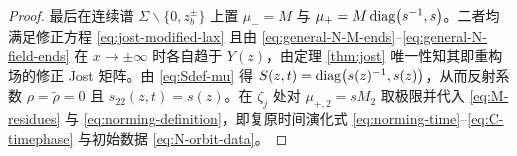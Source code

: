 \begin{proof}
最后在连续谱 $\Sigma\mathbin{\backslash}\{0,z_b^\pm\}$ 上置 $\mu_-=M$ 与 $\mu_+=M\operatorname{diag}\bigl(s^{-1},s\bigr)$。二者均满足修正方程 \eqref{eq:jost-modified-lax} 且由 \eqref{eq:general-N-M-ends}--\eqref{eq:general-N-field-ends} 在 $x\to\pm\infty$ 时各自趋于 $Y(z)$，由定理 \ref{thm:jost} 唯一性知其即重构场的修正 Jost 矩阵。由 \eqref{eq:Sdef-mu} 得 $S(z,t)=\operatorname{diag}\bigl(s(z)^{-1},s(z)\bigr)$，从而反射系数 $\rho=\widetilde\rho=0$ 且 $s_{22}(z,t)=s(z)$。在 $\zeta_j$ 处对 $\mu_{+,2}=sM_2$ 取极限并代入 \eqref{eq:M-residues} 与 \eqref{eq:norming-definition}，即复原时间演化式 \eqref{eq:norming-time}--\eqref{eq:C-timephase} 与初始数据 \eqref{eq:N-orbit-data}。
\end{proof}

